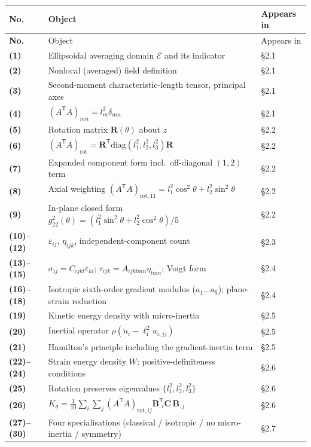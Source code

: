 \documentclass[11pt,a4paper]{article}
\begin{document}
\begin{longtable}{@{}>{\bfseries}p{1.5cm} L{7.4cm} L{5.4cm}@{}}
\toprule
No. & Object & Appears in \\
\midrule
\endfirsthead
\toprule
No. & Object & Appears in \\
\midrule
\endhead
(1) & Ellipsoidal averaging domain $\mathcal E$ and its indicator & \S2.1 \\
(2) & Nonlocal (averaged) field definition & \S2.1 \\
(3) & Second-moment characteristic-length tensor, principal axes & \S2.1 \\
(4) & $(A^{\mathsf T}\!A)_{mn}=l_m^2\delta_{mn}$ & \S2.1 \\
(5) & Rotation matrix $\bm R(\theta)$ about $z$ & \S2.2 \\
(6) & $(A^{\mathsf T}\!A)_{\mathrm{rot}}=\bm R^{\mathsf T}\mathrm{diag}(l_1^2,l_2^2,l_3^2)\bm R$ & \S2.2 \\
(7) & Expanded component form incl.\ off-diagonal $(1,2)$ term & \S2.2 \\
(8) & Axial weighting $(A^{\mathsf T}\!A)_{\mathrm{rot},11}=l_1^2\cos^2\theta+l_2^2\sin^2\theta$ & \S2.2 \\
(9) & In-plane closed form $g_{22}^2(\theta)=(l_1^2\sin^2\theta+l_2^2\cos^2\theta)/5$ & \S2.2 \\
(10)--(12) & $\varepsilon_{ij}$, $\eta_{ijk}$, independent-component count & \S2.3 \\
(13)--(15) & $\sigma_{ij}=C_{ijkl}\varepsilon_{kl}$; $\tau_{ijk}=A_{ijklmn}\eta_{lmn}$; Voigt form & \S2.4 \\
(16)--(18) & Isotropic sixth-order gradient modulus ($a_1\ldots a_5$); plane-strain reduction & \S2.4 \\
(19) & Kinetic energy density with micro-inertia & \S2.5 \\
(20) & Inertial operator $\rho(\ddot u_i-\ell_{\mathrm i}^2\ddot u_{i,jj})$ & \S2.5 \\
(21) & Hamilton's principle including the gradient-inertia term & \S2.5 \\
(22)--(24) & Strain energy density $W$; positive-definiteness conditions & \S2.6 \\
(25) & Rotation preserves eigenvalues $\{l_1^2,l_2^2,l_3^2\}$ & \S2.6 \\
(26) & $K_g=\tfrac{1}{10}\sum_i\sum_j(A^{\mathsf T}\!A)_{\mathrm{rot},ij}\bm B_{,i}^{\mathsf T}\bm C\,\bm B_{,j}$ & \S2.6 \\
(27)--(30) & Four specialisations (classical / isotropic / no micro-inertia / symmetry) & \S2.7 \\

\end{longtable}
\end{document}

